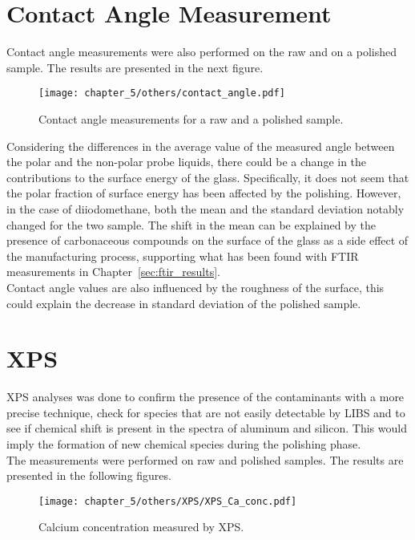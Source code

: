 \section{Contact Angle Measurement}
Contact angle measurements were also performed on the raw and on a polished sample. The results are presented in the next figure.
\begin{figure}[H]
    \centering
    \texttt{[image: chapter\_5/others/contact\_angle.pdf]} 
    \vspace*{-30pt}
    \caption{Contact angle measurements for a raw and a polished sample. }
    \label{fig:contact_angle_raw_polished}
 \end{figure}
Considering the differences in the average value of the measured angle between the polar and the non-polar probe liquids, there could be a change in the contributions to the surface energy of the glass. Specifically, it does not seem that the polar fraction of surface energy has been affected by the polishing. However, in the case of diiodomethane, both the mean and the standard deviation notably changed for the two sample. The shift in the mean can be explained by the presence of carbonaceous compounds on the surface of the glass as a side effect of the manufacturing process, supporting what has been found with FTIR measurements in Chapter~\ref{sec:ftir_results}.
\\
Contact angle values are also influenced by the roughness of the surface, this could explain the decrease in standard deviation of the polished sample.

\section{XPS}
\label{sec:xps_results}
XPS analyses was done to confirm the presence of the contaminants with a more precise technique, check for species that are not easily detectable by LIBS and to see if chemical shift is present in the spectra of aluminum and silicon. This would imply the formation of new chemical species during the polishing phase.
\\
The measurements were performed on raw and polished samples. The results are presented in the following figures.
\\


\begin{figure}[H]
   \centering
   \texttt{[image: chapter\_5/others/XPS/XPS\_Ca\_conc.pdf]} 
   \vspace*{-30pt}
   \caption{Calcium concentration measured by XPS. }
   \label{fig:ca_xps}
\end{figure}


